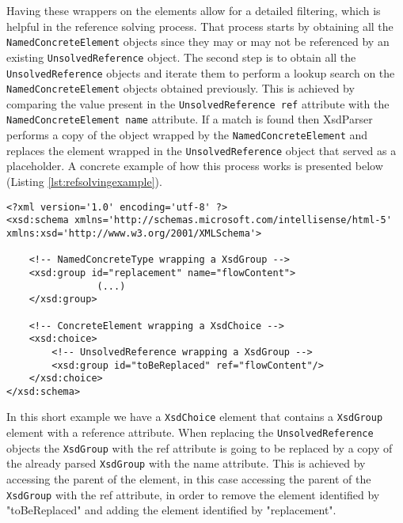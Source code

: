 \noindent
Having these wrappers on the elements allow for a detailed filtering, which is helpful in the reference solving process. That process starts by obtaining all the \texttt{NamedConcreteElement} objects since they may or may not be referenced by an existing \texttt{UnsolvedReference} object. The second step is to obtain all the \texttt{UnsolvedReference} objects and iterate them to perform a lookup search on the \texttt{NamedConcreteElement} objects obtained previously. This is achieved by comparing the value present in the \texttt{UnsolvedReference ref} attribute with the \texttt{NamedConcreteElement name} attribute. If a match is found then XsdParser performs a copy of the object wrapped by the \texttt{NamedConcreteElement} and replaces the element wrapped in the \texttt{UnsolvedReference} object that served as a placeholder. A concrete example of how this process works is presented below (Listing \ref{lst:refsolvingexample}).


\begin{minipage}{\linewidth}
\begin{lstlisting}[caption={Reference Solving Example},captionpos=b,label={lst:refsolvingexample}]
<?xml version='1.0' encoding='utf-8' ?>
<xsd:schema xmlns='http://schemas.microsoft.com/intellisense/html-5' xmlns:xsd='http://www.w3.org/2001/XMLSchema'>
	
    <!-- NamedConcreteType wrapping a XsdGroup -->
    <xsd:group id="replacement" name="flowContent">
				(...)
    </xsd:group>
	
    <!-- ConcreteElement wrapping a XsdChoice -->
    <xsd:choice>
        <!-- UnsolvedReference wrapping a XsdGroup -->
        <xsd:group id="toBeReplaced" ref="flowContent"/>
    </xsd:choice>
</xsd:schema>
\end{lstlisting}
\end{minipage}

\noindent
In this short example we have a \texttt{XsdChoice} element that contains a \texttt{XsdGroup} element with a reference attribute. When replacing the \texttt{UnsolvedReference} objects the \texttt{XsdGroup} with the ref attribute is going to be replaced by a copy of the already parsed \texttt{XsdGroup} with the name attribute. This is achieved by accessing the parent of the element, in this case accessing the parent of the \texttt{XsdGroup} with the ref attribute, in order to remove the element identified by "toBeReplaced" and adding the element identified by "replacement".

